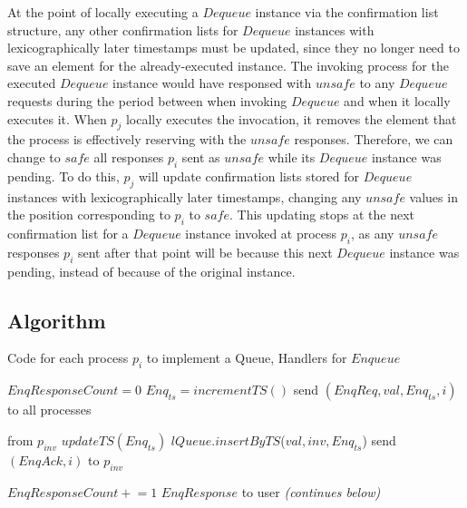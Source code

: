 \documentclass[a4paper,anonymous,USenglish]{lipics-v2021} %
\theoremstyle{definition}
\newcommand{\pluseq}{\mathrel{+}=}
\begin{document}
At the point of locally executing a $Dequeue$ instance via the confirmation list structure, any other confirmation lists for $Dequeue$ instances with lexicographically later timestamps must be updated, since they no longer need to save an element for the already-executed instance.  The invoking process for the executed $Dequeue$ instance would have responsed with $unsafe$ to any $Dequeue$ requests during the period between when invoking $Dequeue$ and when it locally executes it.  When $p_j$ locally executes the invocation, it removes the element that the process is effectively reserving with the $unsafe$ responses. Therefore, we can change to $safe$ all responses $p_i$ sent as $unsafe$ while its $Dequeue$ instance was pending.  To do this, $p_j$ will update confirmation lists stored for $Dequeue$ instances with lexicographically later timestamps, changing any $unsafe$ values in the position corresponding to $p_i$ to $safe$.  This updating stops at the next confirmation list for a $Dequeue$ instance invoked at process $p_i$, as any $unsafe$ responses $p_i$ sent after that point will be because this next $Dequeue$ instance was pending, instead of because of the original instance.

\subsection{Algorithm}


\begin{algorithm}
  \caption{Code for each process $p_i$ to implement a Queue, Handlers for $Enqueue$}\label{alg:fifo}
  \begin{algorithmic}[1]
      \State $EnqResponseCount = 0$ 
      \State $Enq_{ts} = incrementTS()$ \label{fifoline:enqTS} 
      \State send $(EnqReq, val, Enq_{ts}, i)$ to all processes\label{fifoline:sendEnqReq}
    \EndFunction

     from $p_{inv}$
      \State $updateTS(Enq_{ts})$ \label{fifoline:enqReqTSUpdate} 
      \State $lQueue.insertByTS$($val, inv, Enq_{ts}$)\label{fifoline:executeEnq} 
      \State send $(EnqAck, i)$ to $p_{inv}$ \label{fifoline:sendEnqAck} 
    \EndFunction

      \State $EnqResponseCount \pluseq 1$
        \Return $EnqResponse$ to user\label{fifoline:enqReturn} 
      \EndIf
    \EndFunction
    \Statex
    \Statex \emph{(continues below)}
  \end{algorithmic}
\end{algorithm}
\end{document}
